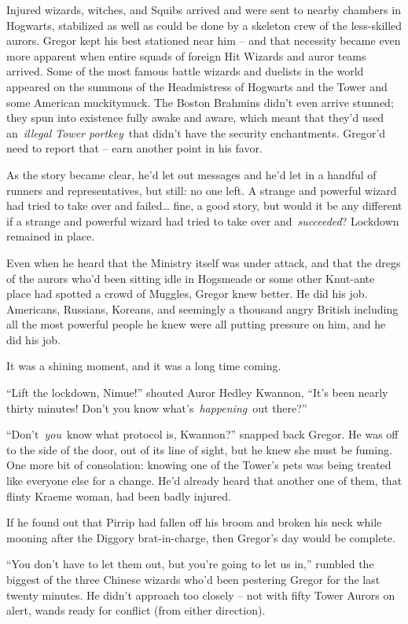 Injured wizards, witches, and Squibs arrived and were sent to nearby
chambers in Hogwarts, stabilized as well as could be done by a skeleton
crew of the less-skilled aurors. Gregor kept his best stationed near him
-- and that necessity became even more apparent when entire squads of
foreign Hit Wizards and auror teams arrived. Some of the most famous
battle wizards and duelists in the world appeared on the summons of the
Headmistress of Hogwarts and the Tower and some American muckitymuck.
The Boston Brahmins didn't even arrive stunned; they spun into existence
fully awake and aware, which meant that they'd used an~\emph{illegal
Tower portkey}~that didn't have the security enchantments. Gregor'd need
to report that -- earn another point in his favor.

As the story became clear, he'd let out messages and he'd let in a
handful of runners and representatives, but still: no one left. A
strange and powerful wizard had tried to take over and failed\ldots{}
fine, a good story, but would it be any different if a strange and
powerful wizard had tried to take over and~\emph{succeeded}? Lockdown
remained in place.

Even when he heard that the Ministry itself was under attack, and that
the dregs of the aurors who'd been sitting idle in Hogsmeade or some
other Knut-ante place had spotted a crowd of Muggles, Gregor knew
better. He did his job. Americans, Russians, Koreans, and seemingly a
thousand angry British including all the most powerful people he knew
were all putting pressure on him, and he did his job.

It was a shining moment, and it was a long time coming.

``Lift the lockdown, Nimue!'' shouted Auror Hedley Kwannon, ``It's been
nearly thirty minutes! Don't you know what's~\emph{happening}~out
there?''

``Don't~\emph{you}~know what protocol is, Kwannon?'' snapped back
Gregor. He was off to the side of the door, out of its line of sight,
but he knew she must be fuming. One more bit of consolation: knowing one
of the Tower's pets was being treated like everyone else for a change.
He'd already heard that another one of them, that flinty Kraeme woman,
had been badly injured.

If he found out that Pirrip had fallen off his broom and broken his neck
while mooning after the Diggory brat-in-charge, then Gregor's day would
be complete.

``You don't have to let them out, but you're going to let us in,''
rumbled the biggest of the three Chinese wizards who'd been pestering
Gregor for the last twenty minutes. He didn't approach too closely --
not with fifty Tower Aurors on alert, wands ready for conflict (from
either direction).

